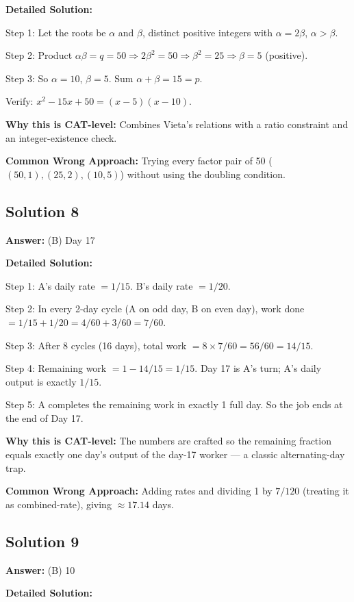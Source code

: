 \documentclass[11pt]{article}
\begin{document}
\textbf{Detailed Solution:}

Step 1: Let the roots be \(\alpha\) and \(\beta\), distinct positive integers with \(\alpha = 2\beta\), \(\alpha > \beta\).

Step 2: Product \(\alpha\beta = q = 50\Rightarrow 2\beta^2 = 50\Rightarrow \beta^2 = 25\Rightarrow \beta = 5\) (positive).

Step 3: So \(\alpha = 10\), \(\beta = 5\). Sum \(\alpha + \beta = 15 = p\).

Verify: \(x^2 - 15x + 50 = (x-5)(x-10)\). \checkmark

\textbf{Why this is CAT-level:}
Combines Vieta's relations with a ratio constraint and an integer-existence check.

\textbf{Common Wrong Approach:}
Trying every factor pair of 50 (\((50,1), (25,2), (10,5)\)) without using the doubling condition.

\subsection*{Solution 8}
\textbf{Answer:} (B) Day 17

\textbf{Detailed Solution:}

Step 1: A's daily rate \(= 1/15\). B's daily rate \(= 1/20\).

Step 2: In every 2-day cycle (A on odd day, B on even day), work done \(= 1/15 + 1/20 = 4/60 + 3/60 = 7/60\).

Step 3: After 8 cycles (16 days), total work \(= 8 \times 7/60 = 56/60 = 14/15\).

Step 4: Remaining work \(= 1 - 14/15 = 1/15\). Day 17 is A's turn; A's daily output is exactly \(1/15\).

Step 5: A completes the remaining work in exactly 1 full day. So the job ends at the end of Day 17.

\textbf{Why this is CAT-level:}
The numbers are crafted so the remaining fraction equals exactly one day's output of the day-17 worker — a classic alternating-day trap.

\textbf{Common Wrong Approach:}
Adding rates and dividing 1 by \(7/120\) (treating it as combined-rate), giving \(\approx 17.14\) days.

\subsection*{Solution 9}
\textbf{Answer:} (B) 10

\textbf{Detailed Solution:}
\end{document}
